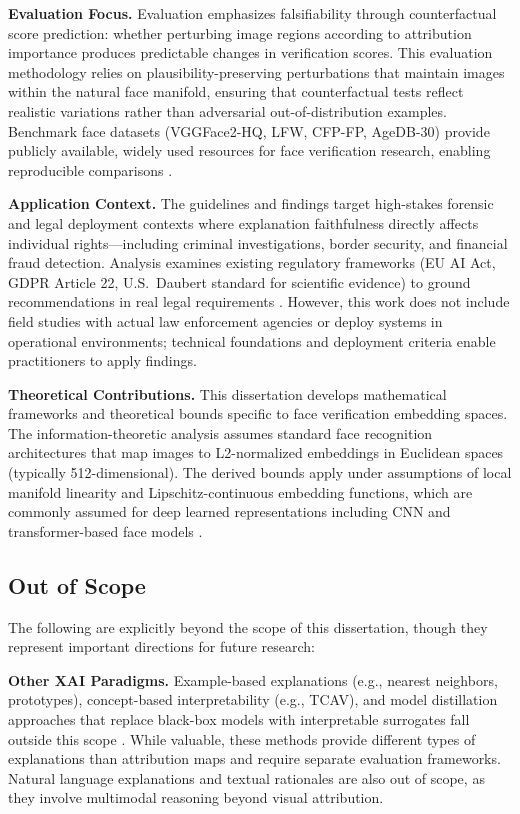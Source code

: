 \textbf{Evaluation Focus.} Evaluation emphasizes falsifiability through counterfactual score prediction: whether perturbing image regions according to attribution importance produces predictable changes in verification scores. This evaluation methodology relies on plausibility-preserving perturbations that maintain images within the natural face manifold, ensuring that counterfactual tests reflect realistic variations rather than adversarial out-of-distribution examples. Benchmark face datasets (VGGFace2-HQ, LFW, CFP-FP, AgeDB-30) provide publicly available, widely used resources for face verification research, enabling reproducible comparisons \cite{cao2018vggface2,huang2007lfw,sengupta2016cfp,moschoglou2017agedb}.

\textbf{Application Context.} The guidelines and findings target high-stakes forensic and legal deployment contexts where explanation faithfulness directly affects individual rights---including criminal investigations, border security, and financial fraud detection. Analysis examines existing regulatory frameworks (EU AI Act, GDPR Article 22, U.S.\ Daubert standard for scientific evidence) to ground recommendations in real legal requirements \cite{euaiact2024,gdpr2016,fed702,daubert1993}. However, this work does not include field studies with actual law enforcement agencies or deploy systems in operational environments; technical foundations and deployment criteria enable practitioners to apply findings.

\textbf{Theoretical Contributions.} This dissertation develops mathematical frameworks and theoretical bounds specific to face verification embedding spaces. The information-theoretic analysis assumes standard face recognition architectures that map images to L2-normalized embeddings in Euclidean spaces (typically 512-dimensional). The derived bounds apply under assumptions of local manifold linearity and Lipschitz-continuous embedding functions, which are commonly assumed for deep learned representations \cite{bengio2013manifold} including CNN and transformer-based face models \cite{deng2019arcface}.

\subsection{Out of Scope}

The following are explicitly beyond the scope of this dissertation, though they represent important directions for future research:

\textbf{Other XAI Paradigms.} Example-based explanations (e.g., nearest neighbors, prototypes), concept-based interpretability (e.g., TCAV), and model distillation approaches that replace black-box models with interpretable surrogates fall outside this scope \cite{chen2019prototypes,kim2018tcav}. While valuable, these methods provide different types of explanations than attribution maps and require separate evaluation frameworks. Natural language explanations and textual rationales are also out of scope, as they involve multimodal reasoning beyond visual attribution.

